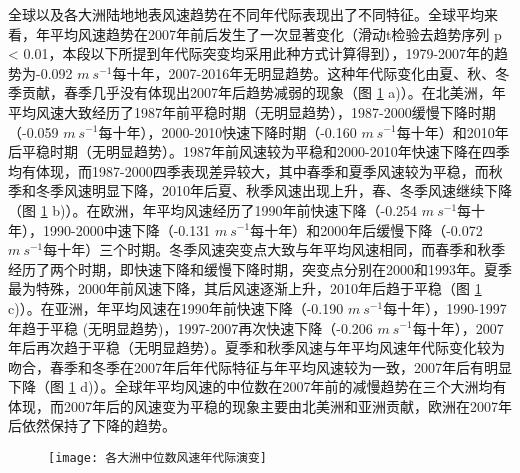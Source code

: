 全球以及各大洲陆地地表风速趋势在不同年代际表现出了不同特征。全球平均来看，年平均风速趋势在2007年前后发生了一次显著变化（滑动t检验去趋势序列 p < 0.01，本段以下所提到年代际突变均采用此种方式计算得到），1979-2007年的趋势为-0.092 $m ~ s^{-1}$每十年，2007-2016年无明显趋势。这种年代际变化由夏、秋、冬季贡献，春季几乎没有体现出2007年后趋势减弱的现象（图 \ref{fig:regionalmedianwinddecadalchange} a)）。在北美洲，年平均风速大致经历了1987年前平稳时期（无明显趋势），1987-2000缓慢下降时期（-0.059 $m ~ s^{-1}$每十年），2000-2010快速下降时期（-0.160 $m ~ s^{-1}$每十年）和2010年后平稳时期（无明显趋势）。1987年前风速较为平稳和2000-2010年快速下降在四季均有体现，而1987-2000四季表现差异较大，其中春季和夏季风速较为平稳，而秋季和冬季风速明显下降，2010年后夏、秋季风速出现上升，春、冬季风速继续下降（图 \ref{fig:regionalmedianwinddecadalchange} b)）。在欧洲，年平均风速经历了1990年前快速下降（-0.254 $m ~ s^{-1}$每十年），1990-2000中速下降（-0.131 $m ~ s^{-1}$每十年）和2000年后缓慢下降（-0.072 $m ~ s^{-1}$每十年）三个时期。冬季风速突变点大致与年平均风速相同，而春季和秋季经历了两个时期，即快速下降和缓慢下降时期，突变点分别在2000和1993年。夏季最为特殊，2000年前风速下降，其后风速逐渐上升，2010年后趋于平稳（图 \ref{fig:regionalmedianwinddecadalchange} c)）。在亚洲，年平均风速在1990年前快速下降（-0.190 $m ~ s^{-1}$每十年），1990-1997年趋于平稳 (无明显趋势)，1997-2007再次快速下降（-0.206 $m ~ s^{-1}$每十年），2007年后再次趋于平稳（无明显趋势）。夏季和秋季风速与年平均风速年代际变化较为吻合，春季和冬季在2007年后年代际特征与年平均风速较为一致，2007年后有明显下降（图 \ref{fig:regionalmedianwinddecadalchange} d)）。全球年平均风速的中位数在2007年前的减慢趋势在三个大洲均有体现，而2007年后的风速变为平稳的现象主要由北美洲和亚洲贡献，欧洲在2007年后依然保持了下降的趋势。

\begin{figure}[!ht]
    \centering
    \texttt{[image: 各大洲中位数风速年代际演变]}
    \label{fig:regionalmedianwinddecadalchange}
\end{figure}

